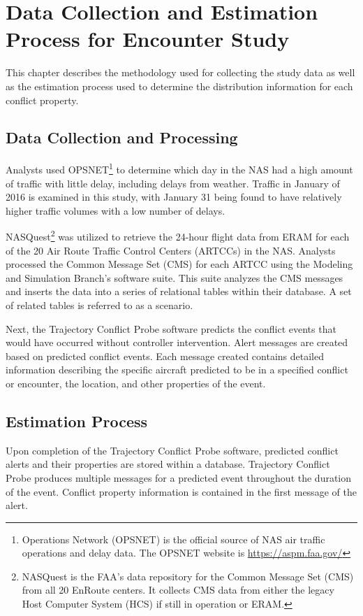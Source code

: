 \chapter{Data Collection and Estimation Process for Encounter Study}
This chapter describes the methodology used for collecting the study data as well as the estimation process used to determine the distribution information for each conflict property.

\section{Data Collection and Processing}
Analysts used OPSNET\footnote{Operations Network (OPSNET) is the official source of NAS air traffic operations and delay data. The OPSNET website is \url{https://aspm.faa.gov/}} to determine which day in the NAS had a high amount of traffic with little delay, including delays from weather. Traffic in January of 2016 is examined in this study, with January 31 being found to have relatively higher traffic volumes with a low number of delays.

NASQuest\footnote{NASQuest is the FAA’s data repository for the Common Message Set (CMS) from all 20 EnRoute centers. It collects CMS data from either the legacy Host Computer System (HCS) if still in operation or ERAM.}  was utilized to retrieve the 24-hour flight data from ERAM for each of the 20 Air Route Traffic Control Centers (ARTCCs) in the NAS. Analysts processed the Common Message Set (CMS) for each ARTCC using the Modeling and Simulation Branch’s software suite. This suite analyzes the CMS messages and inserts the data into a series of relational tables within their database. A set of related tables is referred to as a scenario.

Next, the Trajectory Conflict Probe software predicts the conflict events that would have occurred without controller intervention. Alert messages are created based on predicted conflict events. Each message created contains detailed information describing the specific aircraft predicted to be in a specified conflict or encounter, the location, and other properties of the event.

\section{Estimation Process}
Upon completion of the Trajectory Conflict Probe software, predicted conflict alerts and their properties are stored within a database. Trajectory Conflict Probe produces multiple messages for a predicted event throughout the duration of the event. Conflict property information is contained in the first message of the alert. 

